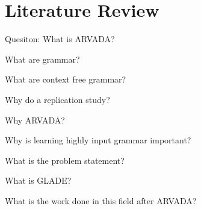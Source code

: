 \chapter{Literature Review}

Quesiton:
What is ARVADA?

What are grammar?

What are context free grammar?

Why do a replication study?

Why ARVADA?

Why is learning highly input grammar important?

What is the problem statement?

What is GLADE?

What is the work done in this field after ARVADA?



